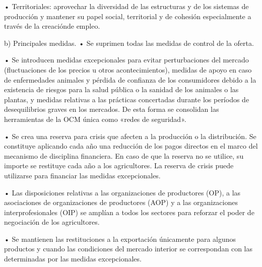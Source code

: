 \documentclass[10pt,a4paper]{article}
\begin{document}
• Territoriales: aprovechar la diversidad de las estructuras y de los sistemas de producción y mantener su papel social, territorial y de cohesión especialmente a través de la creaciónde empleo.

b) Principales medidas.
• Se suprimen todas las medidas de control de la oferta.

• Se introducen medidas excepcionales para evitar perturbaciones del mercado (fluctuaciones de los precios u otros acontecimientos), medidas de apoyo en caso de enfermedades animales y pérdida de confianza de los consumidores debido a la existencia de riesgos para la salud pública o la sanidad de los animales o las plantas, y medidas relativas a las prácticas concertadas durante los períodos de desequilibrios graves en los mercados. De esta forma se consolidan las herramientas de la OCM única como «redes de seguridad».

• Se crea una reserva para crisis que afecten a la producción o la distribución. Se constituye aplicando cada año una reducción de los pagos directos en el marco del mecanismo de disciplina financiera. En caso de que la reserva no se utilice, su importe se restituye cada año a los agricultores. La reserva de crisis puede utilizarse para financiar las medidas excepcionales.

• Las disposiciones relativas a las organizaciones de productores (OP), a las asociaciones de organizaciones de productores (AOP) y a las organizaciones interprofesionales (OIP) se amplían a todos los sectores para reforzar el poder de negociación de los agricultores.

• Se mantienen las restituciones a la exportación únicamente para algunos productos y cuando las condiciones del mercado interior se correspondan con las determinadas por las medidas excepcionales.
\end{document}
